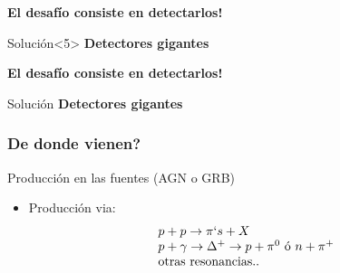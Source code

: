 \begin{frame}
\begin{textblock}{7}
\begin{overprint}
		\vspace*{1cm}
		\begin{block}{}
		\centering 
		\textbf{El desaf\'io consiste en detectarlos!}
		\end{block}
		\vfill
		\begin{alertblock}{Soluci\'on}<5>
		\centering 
		\textbf{Detectores gigantes}
		\end{alertblock}
		\vfill
	\onslide<5>
		\vspace*{1cm}
		\begin{block}{}
		\centering 
		\textbf{El desaf\'io consiste en detectarlos!}
		\end{block}
		\begin{alertblock}{Soluci\'on}
		\centering 
		\textbf{Detectores gigantes}
		\end{alertblock}
   \end{overprint}
 \end{textblock}
\end{frame}

\begin{frame}
 \frametitle{De donde vienen?}
 \begin{block}{Producci\'on en las fuentes (AGN o GRB)}
  \begin{itemize}
   \item Producci\'on via:
   \begin{displaymath}
    \begin{array}{l}
		p + p \rightarrow \pi`s + X \\
		p + \gamma \rightarrow \Delta^{+} \rightarrow p +\pi^{0}\,\,{\rm \acute{o}}\,\, n +\pi^{+} \\
        {\rm otras\,\, resonancias..}
	\end{array}
   \end{displaymath}
  \end{itemize}
 \end{block}
 \vfill
 \begin{center}
 \end{center}
 \vfill
\end{frame}


